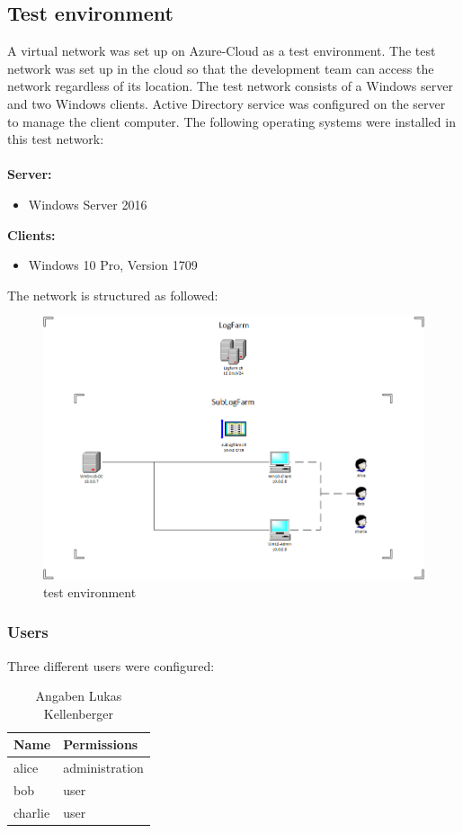 \subsection{Test environment}
A virtual network was set up on Azure-Cloud as a test environment. The test network was set up in the cloud so that the development team can access the network regardless of its location. The test network consists of a Windows server and two Windows clients. Active Directory service was configured on the server to manage the client computer. The following operating systems were installed in this test network: \\
\\
\textbf{Server:}
\begin{itemize}
    \item Windows Server 2016
\end{itemize}
\textbf{Clients:}
\begin{itemize}
    \item Windows 10 Pro, Version 1709
\end{itemize}
The network is structured as followed:\\
\begin{figure}[H]
    \centering
    \includegraphics[width=0.9\linewidth]{assets/testnetwork.png}
    \caption{test environment}
\end{figure}
\subsubsection{Users}
Three different users were configured:
\begin{table}[H]
    \centering
    \begin{tabular}{p{4cm} p{8cm}} \hline
        \textbf{Name} & \textbf{Permissions}  \\ \hline
        alice & administration  \\ \hline
        bob & user  \\ \hline
        charlie & user  \\ \hline
    \end{tabular}
    \caption{Angaben Lukas Kellenberger}
\end{table}